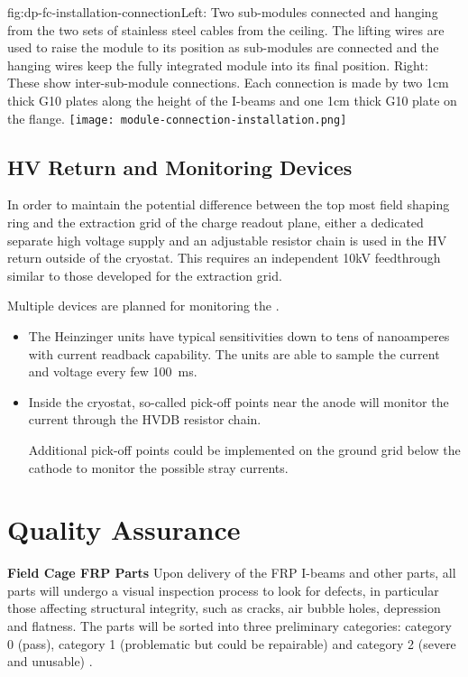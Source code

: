\begin{dunefigure}{fig:dp-fc-installation-connection}{Left: Two sub-modules connected and hanging from the two sets of stainless steel cables from the ceiling.  The lifting wires are used to raise the module to its position as sub-modules are connected and the hanging wires keep the fully integrated module into its final position.  Right: These show inter-sub-module connections.  Each connection is made by two 1cm thick G10 plates along the height of the I-beams and one 1cm thick G10 plate on the flange.}
\texttt{[image: module-connection-installation.png]}
\end{dunefigure}


\subsection{HV Return and Monitoring Devices}

In order to maintain the potential difference between the top most field shaping ring and the extraction grid of the charge readout plane, either a dedicated separate high voltage supply and an adjustable resistor chain is used in the HV return outside of the cryostat.  This requires an independent 10kV feedthrough similar to those developed for the extraction grid.

Multiple devices are planned for monitoring the \hv.  
\begin{itemize}
\item The Heinzinger units have typical sensitivities down to tens of nanoamperes with current readback capability.  The units are able to sample the current and voltage every few \SI{100}{\milli\s}.  
\item Inside the cryostat, so-called pick-off points near the anode will monitor the current through the HVDB resistor chain.  

Additional pick-off points could be implemented on the ground grid below the cathode to monitor the possible stray currents.
\end{itemize}
\noindent 


\section{Quality Assurance}
\label{sec:fddp-hv-qa}

{\bf Field Cage FRP Parts} Upon delivery of the FRP I-beams and other parts, all parts will undergo a visual inspection process to look for defects, in particular those affecting structural integrity, such as cracks, air bubble holes, depression and flatness. The parts will be sorted into three preliminary categories: category 0 (pass), category 1 (problematic but could be repairable) and category 2 (severe and unusable) .

